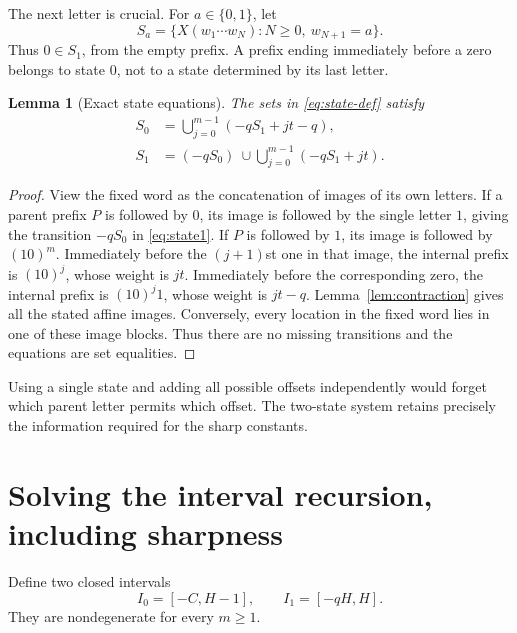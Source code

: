 \documentclass[11pt]{article}
\numberwithin{equation}{section}
\newtheorem{lemma}[theorem]{Lemma}
\theoremstyle{definition}
\theoremstyle{remark}
\begin{document}
The next letter is crucial. For $a\in\{0,1\}$, let
\begin{equation}\label{eq:state-def}
S_a=\{X(w_1\cdots w_N):N\ge0,\ w_{N+1}=a\}.
\end{equation}
Thus $0\in S_1$, from the empty prefix. A prefix ending immediately
before a zero belongs to state $0$, not to a state determined by its last
letter.

\begin{lemma}[Exact state equations]\label{lem:state}
The sets in \eqref{eq:state-def} satisfy
\begin{align}
S_0&=\bigcup_{j=0}^{m-1}(-qS_1+jt-q),\label{eq:state0}\\
S_1&=(-qS_0)\ \cup\!
\bigcup_{j=0}^{m-1}(-qS_1+jt).\label{eq:state1}
\end{align}
\end{lemma}
\begin{proof}
View the fixed word as the concatenation of images of its own letters.
If a parent prefix $P$ is followed by $0$, its image is followed by the
single letter $1$, giving the transition $-qS_0$ in \eqref{eq:state1}.
If $P$ is followed by $1$, its image is followed by $(10)^m$.
Immediately before the $(j+1)$st one in that image, the internal prefix is
$(10)^j$, whose weight is $jt$. Immediately before the corresponding
zero, the internal prefix is $(10)^j1$, whose weight is $jt-q$.
Lemma~\ref{lem:contraction} gives all the stated affine images.
Conversely, every location in the fixed word lies in one of these image
blocks. Thus there are no missing transitions and the equations are
set equalities.
\end{proof}

Using a single state and adding all possible offsets independently would
forget which parent letter permits which offset. The two-state system
retains precisely the information required for the sharp constants.

\section{Solving the interval recursion, including sharpness}\label{sec:intervals}

Define two closed intervals
\begin{equation}\label{eq:intervals}
I_0=[-C,H-1],\qquad I_1=[-qH,H].
\end{equation}
They are nondegenerate for every $m\ge1$.
\end{document}
